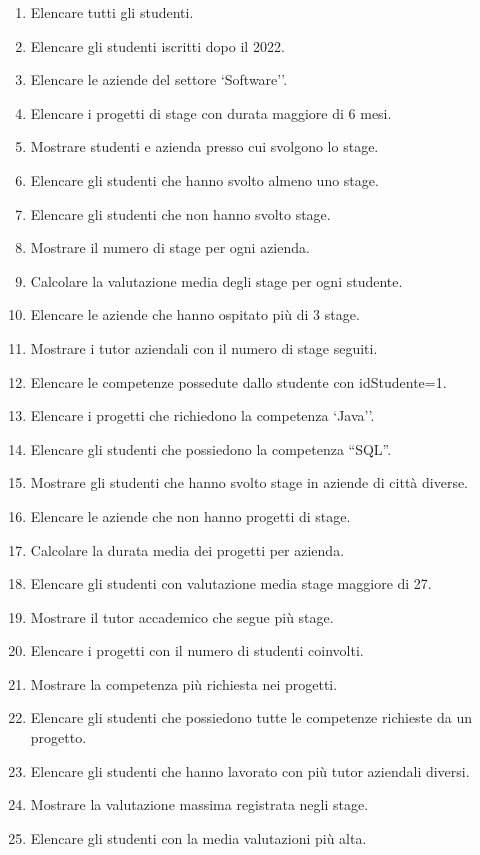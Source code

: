 \documentclass[a4paper,11pt]{article}
\begin{document}
	\begin{enumerate}
		
		\item Elencare tutti gli studenti.
		\item Elencare gli studenti iscritti dopo il 2022.
		\item Elencare le aziende del settore `Software''.
		\item Elencare i progetti di stage con durata maggiore di 6 mesi.
		\item Mostrare studenti e azienda presso cui svolgono lo stage.
		\item Elencare gli studenti che hanno svolto almeno uno stage.
		\item Elencare gli studenti che non hanno svolto stage.
		\item Mostrare il numero di stage per ogni azienda.
		\item Calcolare la valutazione media degli stage per ogni studente.
		\item Elencare le aziende che hanno ospitato più di 3 stage.
		\item Mostrare i tutor aziendali con il numero di stage seguiti.
		\item Elencare le competenze possedute dallo studente con idStudente=1.
		\item Elencare i progetti che richiedono la competenza `Java''.
		\item Elencare gli studenti che possiedono la competenza ``SQL''.
		\item Mostrare gli studenti che hanno svolto stage in aziende di città diverse.
		\item Elencare le aziende che non hanno progetti di stage.
		\item Calcolare la durata media dei progetti per azienda.
		\item Elencare gli studenti con valutazione media stage maggiore di 27.
		\item Mostrare il tutor accademico che segue più stage.
		\item Elencare i progetti con il numero di studenti coinvolti.
		\item Mostrare la competenza più richiesta nei progetti.
		\item Elencare gli studenti che possiedono tutte le competenze richieste da un progetto.
		\item Elencare gli studenti che hanno lavorato con più tutor aziendali diversi.
		\item Mostrare la valutazione massima registrata negli stage.
		\item Elencare gli studenti con la media valutazioni più alta.
		
	\end{enumerate}
	
\end{document}
